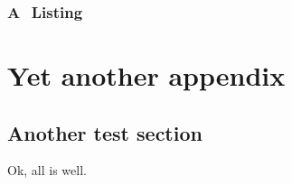 \documentclass[a4paper,11pt]{mscThesis}
\begin{document}
    \subsection{A \matlab $ $ Listing}

    \lstset{language=matlab}
    

    \chapter{Yet another appendix}

    \section{Another test section}

    Ok, all is well.

    \printindex%
    \cleardoublepage%
    
   
\end{document}
